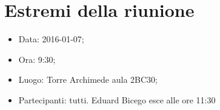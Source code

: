 \documentclass[../Riunione16-01-07.tex]{subfiles}
\begin{document}
\section{Estremi della riunione}
	\begin{itemize}
		\item Data: 2016-01-07;
		\item Ora: 9:30;
		\item Luogo: Torre Archimede aula 2BC30;
		\item Partecipanti: tutti. Eduard Bicego esce alle ore 11:30
	\end{itemize}
\end{document}
